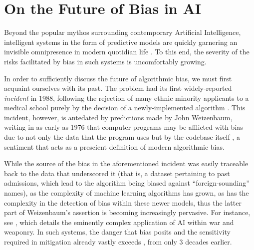 \documentclass[a4paper]{IEEEtran}
\begin{document}
\section{On the Future of Bias in AI}

Beyond the popular mythos surrounding contemporary Artificial Intelligence, intelligent systems in the form of predictive models are quickly garnering an invisible omnipresence in modern quotidian life \cite{omni}. To this end, the severity of the risks facilitated by bias in such systems is uncomfortably growing.


 In order to sufficiently discuss the future of algorithmic bias, we must first acquaint ourselves with its past. The problem had its first widely-reported \textit{incident} in 1988, following the rejection of many ethnic minority applicants to a medical school purely by the decision of a newly-implemented algorithm \cite{b4}. This incident, however, is antedated by predictions made by John Weizenbaum, writing in as early as 1976 that computer programs may be afflicted with bias due to not only the data that the program uses but by the codebase itself \cite{b5}, a sentiment that acts as a prescient definition of modern algorithmic bias.

While the source of the bias in the aforementioned incident was easily traceable back to the data that underscored it (that is, a dataset pertaining to past admissions, which lead to the algorithm being biased against ``foreign-sounding'' names), as the complexity of machine learning algorithms has grown, as has the complexity in the detection of bias within these newer models, thus the latter part of Weizenbaum's assertion is becoming increasingly pervasive. For instance, see \cite{strategic}, which details the eminently complex application of AI within war and weaponry. In such systems, the danger that bias posits and the sensitivity required in mitigation already vastly exceeds \cite{b4}, from only 3 decades earlier. 
\end{document}
